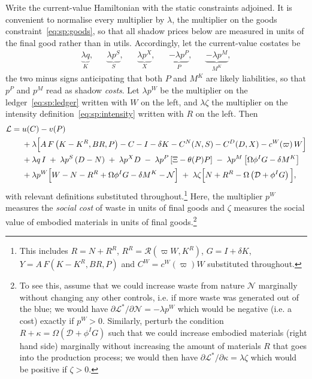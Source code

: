  Write the current-value Hamiltonian with the static constraints
adjoined. It is convenient to normalise every multiplier by $\lambda$, the multiplier on the goods
constraint~\eqref{eq:sp:goods}, so that all shadow prices below are measured in units of the final
good rather than in utils. Accordingly, let the current-value costates be
\begin{align}
\underbrace{\lambda q}_{K},
&&
\underbrace{\lambda p^S}_{S},
&&
\underbrace{\lambda p^X}_{X},
&&
\underbrace{-\lambda p^P}_{P},
&&
\underbrace{-\lambda p^M}_{M^K},
\label{eq:sp:costates-def}
\end{align}
the two minus signs anticipating that both $P$ and $M^K$ are likely liabilities, so that $p^P$ and $p^M$ read as shadow \emph{costs}. Let $\lambda p^W$ be the multiplier on the ledger~\eqref{eq:sp:ledger} written with $W$ on the left, and $\lambda\zeta$ the multiplier on the intensity definition~\eqref{eq:sp:intensity} written with
$R$ on the left. Then
\begin{align}
\mathcal L
={}& u(C)-v(P)
\notag\\
&+\lambda\Big[A\,F\left(K-K^R,BR,P\right)-C-I-\delta K-C^N(N,S)-C^D(D,X)-c^W\!\left(\varpi\right)W\Big]
\notag\\
&+\lambda q\,I
\;+\;\lambda p^S\left(D-N\right)
\;+\;\lambda p^X D
\;-\;\lambda p^P\left[\Xi-\theta(P)P\right]
\;-\;\lambda p^M\left[\Omega\phi^IG-\delta M^K\right]
\notag\\
&+\lambda p^W\Big[W-N-R^R+\Omega\phi^IG-\delta M^K-\mathcal N\Big]
\;+\;\lambda \zeta\Big[N+R^R-\Omega\left(\mathcal D+\phi^IG\right)\Big],
\label{eq:sp:lagrangian}
\end{align}
with relevant definitions substituted throughout.\footnote{This includes $R=N+R^R$, $R^R=\mathcal R\left(\varpi W,K^R\right)$, $G=I+\delta K$, $Y=A\,F\left(K-K^R,BR,P\right)$
and $C^W=c^W\!\left(\varpi\right)W$ substituted throughout.} Here, the multiplier $p^W$ measures the \textit{social cost} of waste in units of final goods and $\zeta$ measures the social value of embodied materials in units of final goods.\footnote{To see this, assume that we could increase waste from nature $\mathcal{N}$ marginally without changing any other controls, i.e. if more waste was generated out of the blue; we would have $\partial \mathcal L^*/\partial \mathcal N = - \lambda p^W$ which would be negative (i.e. a cost) exactly if $p^W>0$. Similarly, perturb the condition $R + \kappa = \Omega \left(\mathcal{D}+\phi^IG\right)$ such that we could increase embodied materials (right hand side) marginally without increasing the amount of materials $R$ that goes into the production process; we would then have $\partial \mathcal L^*/\partial \kappa = \lambda \zeta$ which would be positive if $\zeta>0$.} 



